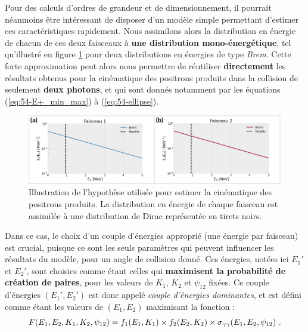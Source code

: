 \begin{refsection}
Pour des calculs d'ordres de grandeur et de dimensionnement, il pourrait néanmoins être intéressant de disposer d'un modèle simple permettant d'estimer ces caractéristiques rapidement. Nous assimilons alors la distribution en énergie de chacun de ces deux faisceaux à \textbf{une distribution mono-énergétique}, tel qu'illustré en figure \ref{fig:54-hypothese_cinematique} pour deux distributions en énergies de type \textit{Brem}. Cette forte approximation peut alors nous permettre de réutiliser \textbf{directement} les résultats obtenus pour la cinématique des positrons produits dans la collision de seulement \textbf{deux photons}, et qui sont donnés notamment par les équations (\ref{eq:54-E+_min_max}) à (\ref{eq:54-ellipse}). 


\begin{figure}[hbtp]
	\centering
	\includegraphics[width=\linewidth]{5-opti_theorique/hypothese_cinematique.png}
	\caption{Illustration de l'hypothèse utilisée pour estimer la cinématique des positrons produits. La distribution en énergie de chaque faisceau est assimilée à une distribution de Dirac représentée en tirets noirs.}
	\label{fig:54-hypothese_cinematique}
\end{figure}


Dans ce cas, le choix d'un couple d'énergies approprié (une énergie par faisceau) est crucial, puisque ce sont les seuls paramètres qui peuvent influencer les résultats du modèle, pour un angle de collision donné. Ces énergies, notées ici $E_1'$ et $E_2'$, sont choisies comme étant celles qui \textbf{maximisent la probabilité de création de paires}, pour les valeurs de $K_1$, $K_2$ et $\psi_{12}$ fixées. Ce couple d'énergies $(E_1', E_2')$ est donc appelé \textit{couple d'énergies dominantes}, et est défini comme étant les valeurs de $(E_1,E_2)$ maximisant la fonction :
\begin{equation}
    F(E_1, E_2, K_1, K_2, \psi_{12})=f_1(E_1,K_1) \times f_2(E_2,K_2)  \times \sigma_{\gamma\gamma}(E_1,E_2,\psi_{12}) ~ \rm .
    \label{eq:54-F_definition}
\end{equation}



\end{refsection}
